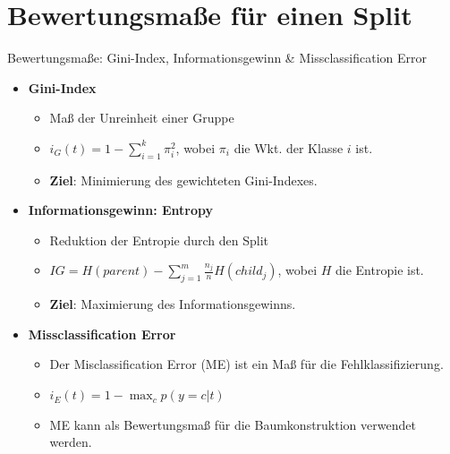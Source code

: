 \documentclass{beamer}
\begin{document}

\section{Bewertungsmaße für einen Split}

\begin{frame}{Bewertungsmaße: Gini-Index, Informationsgewinn \& Missclassification Error}
	\begin{itemize}
		\item{\textbf{Gini-Index}}
		\begin{itemize}
			\item Maß der Unreinheit einer Gruppe
			\item $i_G (t) = 1 - \sum_{i=1}^k \pi_i^2$, wobei $\pi_i$ die Wkt. der Klasse $i$ ist.
			\item \textbf{Ziel}: Minimierung des gewichteten Gini-Indexes.
		\end{itemize}
		\item{\textbf{Informationsgewinn: Entropy}}
		\begin{itemize}
			\item Reduktion der Entropie durch den Split
			\item $IG = H(parent) - \sum_{j=1}^m \frac{n_j}{n} H(child_j)$, wobei $H$ die Entropie ist.
			\item \textbf{Ziel}: Maximierung des Informationsgewinns.
		\end{itemize}
		\item{\textbf{Missclassification Error}}
		\begin{itemize}
			\item {Der Misclassification Error (ME) ist ein Maß für die Fehlklassifizierung.}
			\item $i_E (t) = 1 - \max_c p(y = c | t)$
			\item {ME kann als Bewertungsmaß für die Baumkonstruktion verwendet werden.}
		\end{itemize}
	\end{itemize}
\end{frame}
\end{document}
